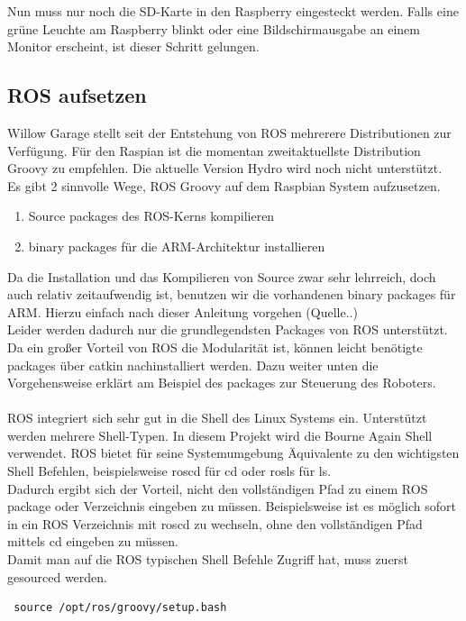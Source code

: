 \documentclass[12pt]{article}
\begin{document}
Nun muss nur noch die SD-Karte in den Raspberry eingesteckt werden. Falls eine grüne Leuchte am Raspberry blinkt oder eine Bildschirmausgabe an einem Monitor erscheint, ist dieser Schritt gelungen.

\subsection{ROS aufsetzen}
Willow Garage stellt seit der Entstehung von ROS mehrerere Distributionen zur Verfügung.
Für den Raspian ist die momentan zweitaktuellste Distribution Groovy zu empfehlen. 
Die aktuelle Version Hydro wird noch nicht unterstützt. \\
Es gibt 2 sinnvolle Wege, ROS Groovy auf dem Raspbian System aufzusetzen.
\begin{enumerate}
\item Source packages des ROS-Kerns kompilieren
\item binary packages für die ARM-Architektur installieren
\end{enumerate}

Da die Installation und das Kompilieren von Source zwar sehr lehrreich, doch auch relativ zeitaufwendig ist, benutzen wir die vorhandenen binary packages für ARM. 
Hierzu einfach nach dieser Anleitung vorgehen (Quelle..) \\
Leider werden dadurch nur die grundlegendsten Packages von ROS unterstützt.
Da ein großer Vorteil von ROS die Modularität ist, können leicht benötigte packages über catkin nachinstalliert werden.
Dazu weiter unten die Vorgehensweise erklärt am Beispiel des packages zur Steuerung des Roboters.\\
\\
ROS integriert sich sehr gut in die Shell des Linux Systems ein.
Unterstützt werden mehrere Shell-Typen. In diesem Projekt wird die Bourne Again Shell verwendet.
ROS bietet für seine Systemumgebung Äquivalente zu den wichtigsten Shell Befehlen, beispielsweise roscd für cd oder rosls für ls. \\
Dadurch ergibt sich der Vorteil, nicht den vollständigen Pfad zu einem ROS package oder Verzeichnis eingeben zu müssen. Beispielsweise ist es möglich sofort in ein ROS Verzeichnis mit roscd zu wechseln, ohne den vollständigen Pfad mittels cd eingeben zu müssen. \\
Damit man auf die ROS typischen Shell Befehle Zugriff hat, muss zuerst gesourced werden.

 \begin{lstlisting}
 source /opt/ros/groovy/setup.bash
 \end{lstlisting}
\end{document}
